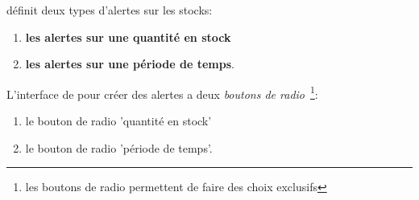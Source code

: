 \yeroth d\'efinit deux types d'alertes sur les stocks:
\begin{enumerate}[1)]
	\item \textbf{les alertes sur une quantit\'e en stock}
	\item \textbf{les alertes sur une p\'eriode de temps}.\\
\end{enumerate}

L'interface de \yeroth pour cr\'eer des alertes a deux
\emph{boutons de radio}~\footnote{les boutons de radio
	permettent de faire des choix exclusifs}:

\begin{enumerate}[1)]
	\item le bouton de radio 'quantit\'e en stock'
	\item le bouton de radio 'p\'eriode de temps'.
\end{enumerate}


\newpage
{}\label{sec:alerte-quantite-stock}

